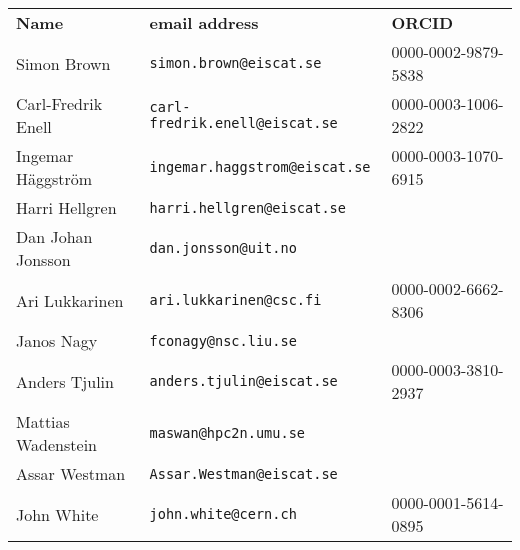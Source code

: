 \begin{tabular}{lll}
{\bf Name} & {\bf email address} & {\bf ORCID} \\
Simon Brown & {\tt simon.brown@eiscat.se} & 0000-0002-9879-5838 \\
Carl-Fredrik Enell & {\tt carl-fredrik.enell@eiscat.se} & 0000-0003-1006-2822\\
Ingemar H\"{a}ggstr\"{o}m & {\tt ingemar.haggstrom@eiscat.se} & 0000-0003-1070-6915 \\
Harri Hellgren & {\tt harri.hellgren@eiscat.se} & \\
Dan Johan Jonsson & {\tt dan.jonsson@uit.no} & \\
Ari Lukkarinen & {\tt ari.lukkarinen@csc.fi} & 0000-0002-6662-8306\\
Janos Nagy & {\tt fconagy@nsc.liu.se} & \\
Anders Tjulin & {\tt anders.tjulin@eiscat.se} & 0000-0003-3810-2937 \\
Mattias Wadenstein & {\tt maswan@hpc2n.umu.se} & \\
Assar Westman & {\tt Assar.Westman@eiscat.se} & \\
John White & {\tt john.white@cern.ch} & 0000-0001-5614-0895 \\
\end{tabular}
